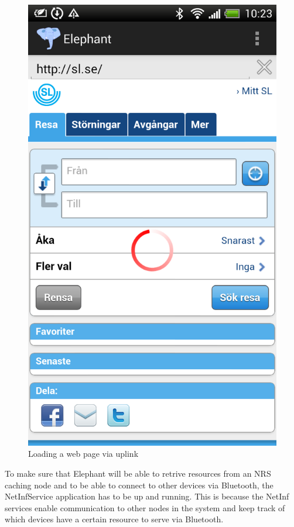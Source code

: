 \begin{figure}
\centering
\includegraphics[scale=0.29]{img/loaded_page.png}
\caption{Loading a web page via uplink}\label{fig:loaded_page}
\end{figure}

To make sure that Elephant will be able to retrive resources from an NRS caching node and to be able
to connect to other devices via Bluetooth, the NetInfService application has to be up and running.
This is because the NetInf services enable communication to other nodes in the system and keep
track of which devices have a certain resource to serve via Bluetooth.

